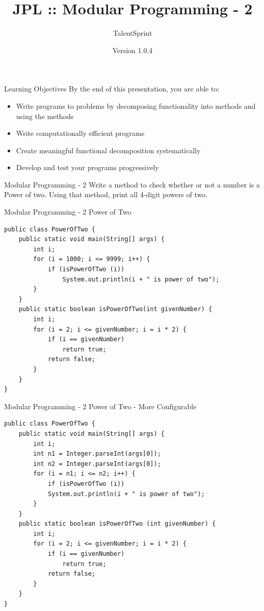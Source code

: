 \documentclass[14pt]{beamer}
\title[JPL:Java:02]{JPL :: Modular Programming - 2}
\author[TS]{TalentSprint}
\institute[L\&D]{Licensed To Skill}
\date{Version 1.0.4}
\begin{document}
\begin{frame}
  \titlepage
\end{frame}

\begin{frame}{Learning Objectives}
By the end of this presentation, you are able to:
  \begin{itemize}
  \item Write programs to problems by decomposing functionality into methods and using the methods
  \item Write computationally efficient programs
  \item Create meaningful functional decomposition systematically
  \item Develop and test your programs progressively
  \end{itemize}
\end{frame}

\begin{frame}{Modular Programming - 2}
Write a method to check whether or not a number is a Power of two. Using that method, print all 4-digit powers of two.
\end{frame}

\begin{frame}[fragile]{Modular Programming - 2}
Power of Two
\begin{lstlisting}[numbers=none]
public class PowerOfTwo {
    public static void main(String[] args) {
        int i;
        for (i = 1000; i <= 9999; i++) {
            if (isPowerOfTwo (i))
                System.out.println(i + " is power of two");
        }
    }
    public static boolean isPowerOfTwo(int givenNumber) {
        int i;
        for (i = 2; i <= givenNumber; i = i * 2) {
            if (i == givenNumber) 
                return true;
            return false;
        }
    }
}
\end{lstlisting}
\end{frame}

\begin{frame}[fragile]{Modular Programming - 2}
Power of Two - More Configurable
\begin{lstlisting}[numbers=none]
public class PowerOfTwo {
    public static void main(String[] args) {
        int i;
        int n1 = Integer.parseInt(args[0]);
        int n2 = Integer.parseInt(args[0]);
        for (i = n1; i <= n2; i++) {
            if (isPowerOfTwo (i))
	        System.out.println(i + " is power of two");
        }
    }
    public static boolean isPowerOfTwo (int givenNumber) {
        int i;
        for (i = 2; i <= givenNumber; i = i * 2) {
            if (i == givenNumber) 
                return true;
            return false;   
        }
    }
}
\end{lstlisting}
\end{frame}
\end{document}
